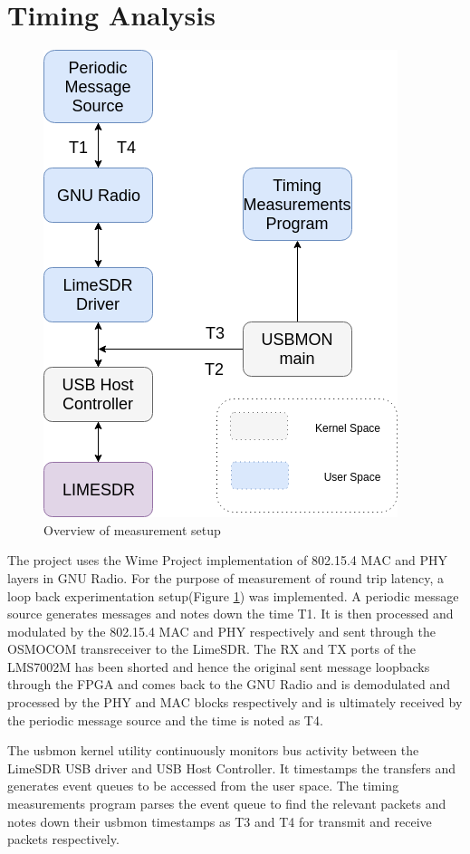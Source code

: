 \documentclass{kththesis}
\begin{document}
\section{Timing Analysis}
\begin{figure}[h!]
\centering
\includegraphics[scale=0.6]{Figure/Setup.png}
\caption{Overview of measurement setup}
\label{setup_overview}
\end{figure}
The project uses the Wime Project implementation of 802.15.4 MAC and PHY layers in GNU Radio. For the purpose of measurement of round trip latency, a loop back experimentation setup(Figure \ref{setup_overview}) was implemented. A periodic message source generates messages and notes down the time T1. It is then processed and modulated by the 802.15.4 MAC and PHY respectively and sent through the OSMOCOM transreceiver to the LimeSDR. The RX and TX ports of the LMS7002M has been shorted and hence the original sent message loopbacks through the FPGA and comes back to the GNU Radio and is demodulated and processed by the PHY and MAC blocks respectively and is ultimately received by the periodic message source and the time is noted as T4.

The usbmon kernel utility continuously monitors bus activity between the LimeSDR USB driver and USB Host Controller. It timestamps the transfers and generates event queues to be accessed from the user space. The timing measurements program parses the event queue to find the relevant packets and notes down their usbmon timestamps as T3 and T4 for transmit and receive packets respectively.  
\end{document}
